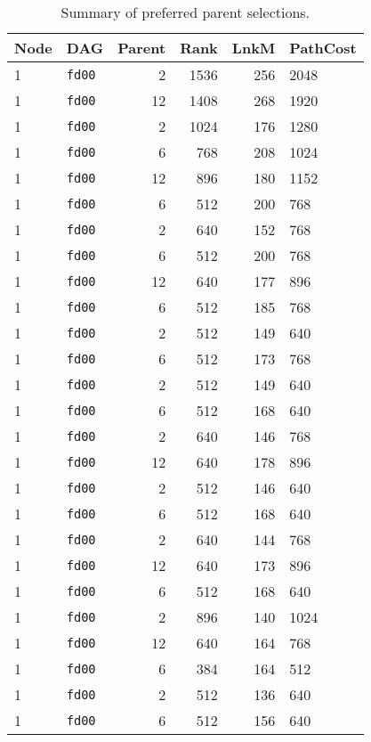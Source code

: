 \documentclass{article}
\begin{document}
\begin{table}[h!]
  \centering
  \caption{Summary of preferred parent selections.}
  \begin{tabular}{llrrrl}
    \toprule
    \textbf{Node} & \textbf{DAG} & \textbf{Parent} & \textbf{Rank} & \textbf{LnkM} & \textbf{PathCost} \\
    \midrule
    1 & \texttt{fd00} & 2 & 1536 & 256 & 2048 \\
    1 & \texttt{fd00} & 12 & 1408 & 268 & 1920 \\
    1 & \texttt{fd00} & 2 & 1024 & 176 & 1280 \\
    1 & \texttt{fd00} & 6 & 768 & 208 & 1024 \\
    1 & \texttt{fd00} & 12 & 896 & 180 & 1152 \\
    1 & \texttt{fd00} & 6 & 512 & 200 & 768 \\
    1 & \texttt{fd00} & 2 & 640 & 152 & 768 \\
    1 & \texttt{fd00} & 6 & 512 & 200 & 768 \\
    1 & \texttt{fd00} & 12 & 640 & 177 & 896 \\
    1 & \texttt{fd00} & 6 & 512 & 185 & 768 \\
    1 & \texttt{fd00} & 2 & 512 & 149 & 640 \\
    1 & \texttt{fd00} & 6 & 512 & 173 & 768 \\
    1 & \texttt{fd00} & 2 & 512 & 149 & 640 \\
    1 & \texttt{fd00} & 6 & 512 & 168 & 640 \\
    1 & \texttt{fd00} & 2 & 640 & 146 & 768 \\
    1 & \texttt{fd00} & 12 & 640 & 178 & 896 \\
    1 & \texttt{fd00} & 2 & 512 & 146 & 640 \\
    1 & \texttt{fd00} & 6 & 512 & 168 & 640 \\
    1 & \texttt{fd00} & 2 & 640 & 144 & 768 \\
    1 & \texttt{fd00} & 12 & 640 & 173 & 896 \\
    1 & \texttt{fd00} & 6 & 512 & 168 & 640 \\
    1 & \texttt{fd00} & 2 & 896 & 140 & 1024 \\
    1 & \texttt{fd00} & 12 & 640 & 164 & 768 \\
    1 & \texttt{fd00} & 6 & 384 & 164 & 512 \\
    1 & \texttt{fd00} & 2 & 512 & 136 & 640 \\
    1 & \texttt{fd00} & 6 & 512 & 156 & 640 \\

\end{tabular}
\end{table}
\end{document}
